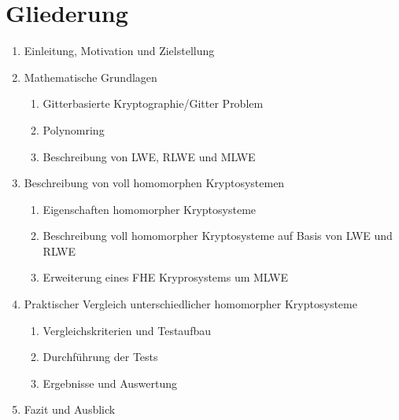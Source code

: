 \chapter{Gliederung}
\label{Grob-Gliederung}

\begin{enumerate}
  \item Einleitung, Motivation und Zielstellung
  \item Mathematische Grundlagen
        \begin{enumerate}
          \item Gitterbasierte Kryptographie/Gitter Problem
          \item Polynomring
          \item Beschreibung von LWE, RLWE und MLWE
        \end{enumerate}
  \item Beschreibung von voll homomorphen Kryptosystemen
        \begin{enumerate}
          \item Eigenschaften homomorpher Kryptosysteme
          \item Beschreibung voll homomorpher Kryptosysteme auf Basis von LWE und RLWE
          \item Erweiterung eines FHE Kryprosystems um MLWE
        \end{enumerate}
  \item Praktischer Vergleich unterschiedlicher homomorpher Kryptosysteme
        \begin{enumerate}
          \item Vergleichskriterien und Testaufbau
          \item Durchführung der Tests
          \item Ergebnisse und Auswertung
        \end{enumerate}
  \item Fazit und Ausblick
\end{enumerate}

